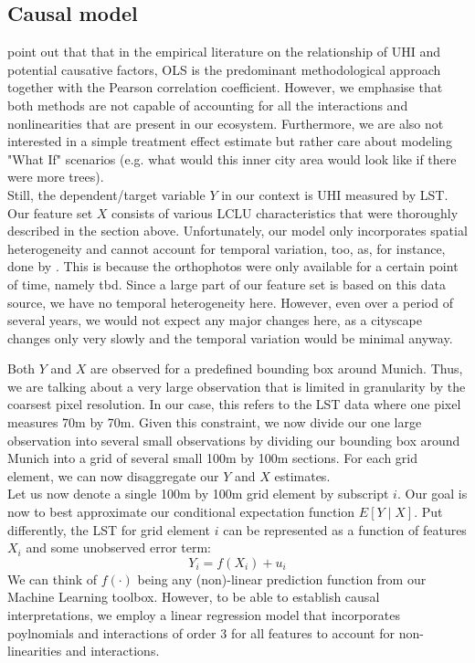 \documentclass[12pt]{article}
\begin{document}
\subsection{Causal model}

\citet{deilami2018} point out that that in the empirical literature on the relationship of UHI and potential causative factors, OLS is the predominant methodological approach together with the Pearson correlation coefficient. However, we emphasise that both methods are not capable of accounting for all the interactions and nonlinearities that are present in our ecosystem. Furthermore, we are also not interested in a simple treatment effect estimate but rather care about modeling "What If" scenarios (e.g. what would this inner city area would look like if there were more trees).\\
Still, the dependent/target variable $Y$ in our context is UHI measured by LST. Our feature set $X$ consists of various LCLU characteristics that were thoroughly described in the section above. Unfortunately, our model only incorporates spatial heterogeneity and cannot account for temporal variation, too, as, for instance, done by \citet{seebacher2019}. This is because the orthophotos were only available for a certain point of time, namely tbd. Since a large part of our feature set is based on this data source, we have no temporal heterogeneity here. However, even over a period of several years, we would not expect any major changes here, as a cityscape changes only very slowly and the temporal variation would be minimal anyway.

Both $Y$ and $X$ are observed for a predefined bounding box around Munich. Thus, we are talking about a very large observation that is limited in granularity by the coarsest pixel resolution. In our case, this refers to the LST data \citep{ecostress2019} where one pixel measures 70m by 70m. Given this constraint, we now divide our one large observation into several small observations by dividing our bounding box around Munich into a grid of several small 100m by 100m sections. For each grid element, we can now disaggregate our $Y$ and $X$ estimates.\\
Let us now denote a single 100m by 100m grid element by subscript $i$. Our goal is now to best approximate our conditional expectation function $E[ Y \mid X ]$. Put differently, the LST for grid element $i$ can be represented as a function of features $X_i$ and some unobserved error term:
\begin{equation}
Y_i = f(X_i) + u_i
\end{equation}
We can think of $f(\cdot)$ being any (non)-linear prediction function from our Machine Learning toolbox. However, to be able to establish causal interpretations, we employ a linear regression model that incorporates poylnomials and interactions of order 3 for all features to account for non-linearities and interactions.
\end{document}
